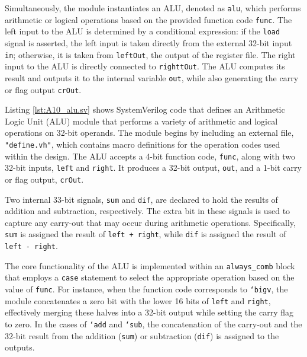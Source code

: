{Simultaneously, the module instantiates an ALU, denoted as \texttt{alu}, which performs arithmetic or logical operations based on the provided function code \texttt{func}. The left input to the ALU is determined by a conditional expression: if the \texttt{load} signal is asserted, the left input is taken directly from the external 32-bit input \texttt{in}; otherwise, it is taken from \texttt{leftOut}, the output of the register file. The right input to the ALU is directly connected to \texttt{righttOut}. The ALU computes its result and outputs it to the internal variable \texttt{out}, while also generating the carry or flag output \texttt{crOut}.


Listing \ref{lst:A10_alu.sv} shows SystemVerilog code that defines an Arithmetic Logic Unit (ALU) module that performs a variety of arithmetic and logical operations on 32-bit operands. The module begins by including an external file, \texttt{"define.vh"}, which contains macro definitions for the operation codes used within the design. The ALU accepts a 4-bit function code, \texttt{func}, along with two 32-bit inputs, \texttt{left} and \texttt{right}. It produces a 32-bit output, \texttt{out}, and a 1-bit carry or flag output, \texttt{crOut}.

Two internal 33-bit signals, \texttt{sum} and \texttt{dif}, are declared to hold the results of addition and subtraction, respectively. The extra bit in these signals is used to capture any carry-out that may occur during arithmetic operations. Specifically, \texttt{sum} is assigned the result of \texttt{left + right}, while \texttt{dif} is assigned the result of \texttt{left - right}.

The core functionality of the ALU is implemented within an \texttt{always\_comb} block that employs a \texttt{case} statement to select the appropriate operation based on the value of \texttt{func}. For instance, when the function code corresponds to \texttt{`bigv}, the module concatenates a zero bit with the lower 16 bits of \texttt{left} and \texttt{right}, effectively merging these halves into a 32-bit output while setting the carry flag to zero. In the cases of \texttt{`add} and \texttt{`sub}, the concatenation of the carry-out and the 32-bit result from the addition (\texttt{sum}) or subtraction (\texttt{dif}) is assigned to the outputs.

}
